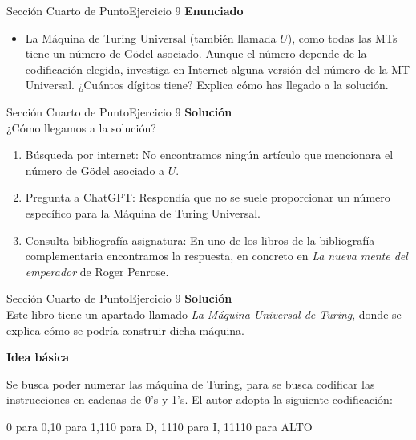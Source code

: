 \documentclass[10pt, envcountsect, presentation, aspectratio=169]{beamer}
\begin{document}

\begin{frame}{Sección Cuarto de Punto}{Ejercicio 9}
    \textbf{Enunciado}
    \begin{itemize}
        \item La Máquina de Turing Universal (también llamada $U$), como todas las MTs tiene un número de Gödel asociado. Aunque el número depende de la codificación elegida, investiga en Internet alguna versión del número de la MT Universal. ¿Cuántos  dígitos tiene? Explica cómo has llegado a la solución.
    \end{itemize}
\end{frame}


\begin{frame}{Sección Cuarto de Punto}{Ejercicio 9}
    \textbf{Solución}\\
    ¿Cómo llegamos a la solución?
    \begin{enumerate}
        \item Búsqueda por internet: No encontramos ningún artículo que mencionara el número de Gödel asociado a $U$.
        \item Pregunta a ChatGPT: Respondía que no se suele proporcionar un número específico para la Máquina de Turing Universal.
        \item Consulta bibliografía asignatura: En uno de los libros de la bibliografía complementaria encontramos la respuesta, en concreto en \textit{La nueva mente del emperador} de Roger Penrose.
    \end{enumerate}
\end{frame}

\begin{frame}{Sección Cuarto de Punto}{Ejercicio 9}
    \textbf{Solución}\\
    Este libro tiene un apartado llamado \textit{La Máquina Universal de Turing}, donde se explica cómo se podría construir dicha máquina.
    \vspace{3mm}
    \begin{center}
        \textbf{Idea básica}
    \end{center}
    
    
    Se busca poder numerar las máquina de Turing, para se busca codificar las instrucciones en cadenas de 0's y 1's. El autor adopta la siguiente codificación:
    
    \begin{center}
        0 para 0,\hspace{1cm}10 para 1,\hspace{1cm}110 para D,\hspace{1cm}   1110 para I,\hspace{1cm}   11110 para ALTO
    \end{center}

    
\end{frame}
\end{document}

